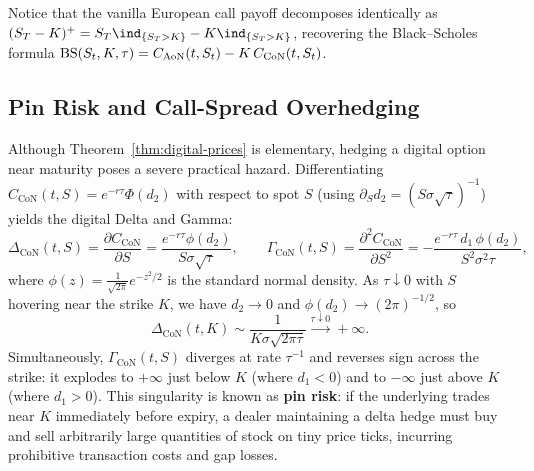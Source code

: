 Notice that the vanilla European call payoff decomposes identically as $(S_T - K)^+ = S_T\ind_{\{S_T > K\}} - K\ind_{\{S_T > K\}}$, recovering the Black--Scholes formula $\operatorname{BS}(S_t, K, \tau) = C_{\mathrm{AoN}}(t, S_t) - K\,C_{\mathrm{CoN}}(t, S_t)$.

\subsection*{Pin Risk and Call-Spread Overhedging}

Although Theorem~\ref{thm:digital-prices} is elementary, hedging a digital option near maturity poses a severe practical hazard. Differentiating $C_{\mathrm{CoN}}(t, S) = e^{-r\tau}\Phi(d_2)$ with respect to spot $S$ (using $\partial_S d_2 = (S\sigma\sqrt{\tau})^{-1}$) yields the digital Delta and Gamma:
\begin{equation}\label{eq:digital-greeks}
    \Delta_{\mathrm{CoN}}(t, S) = \frac{\partial C_{\mathrm{CoN}}}{\partial S} = \frac{e^{-r\tau}\phi(d_2)}{S\sigma\sqrt{\tau}}, \qquad
    \Gamma_{\mathrm{CoN}}(t, S) = \frac{\partial^2 C_{\mathrm{CoN}}}{\partial S^2} = -\frac{e^{-r\tau}\,d_1\,\phi(d_2)}{S^2\sigma^2\tau},
\end{equation}
where $\phi(z) = \frac{1}{\sqrt{2\pi}}e^{-z^2/2}$ is the standard normal density. As $\tau \downarrow 0$ with $S$ hovering near the strike $K$, we have $d_2 \to 0$ and $\phi(d_2) \to (2\pi)^{-1/2}$, so
\[
\Delta_{\mathrm{CoN}}(t, K) \sim \frac{1}{K\sigma\sqrt{2\pi\tau}} \xrightarrow{\tau \downarrow 0} +\infty.
\]
Simultaneously, $\Gamma_{\mathrm{CoN}}(t, S)$ diverges at rate $\tau^{-1}$ and reverses sign across the strike: it explodes to $+\infty$ just below $K$ (where $d_1 < 0$) and to $-\infty$ just above $K$ (where $d_1 > 0$). This singularity is known as \textbf{pin risk}: if the underlying trades near $K$ immediately before expiry, a dealer maintaining a delta hedge must buy and sell arbitrarily large quantities of stock on tiny price ticks, incurring prohibitive transaction costs and gap losses.

